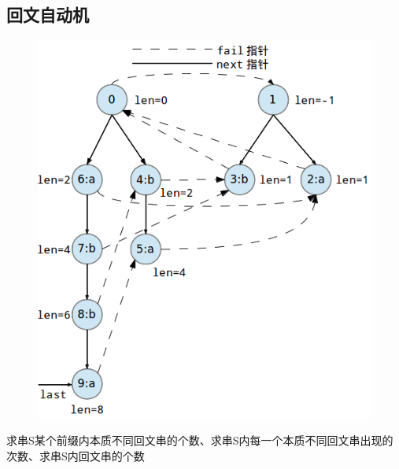 \documentclass[UTF8,a4paper,titlepage]{ctexart}
\begin{document}
\subsection{回文自动机}
\begin{figure}[h!]
\centering
\includegraphics[scale=0.6]{Palin.png}
\label{fig:Palin}
\end{figure}
求串S某个前缀内本质不同回文串的个数、求串S内每一个本质不同回文串出现的次数、求串S内回文串的个数
\end{document}
